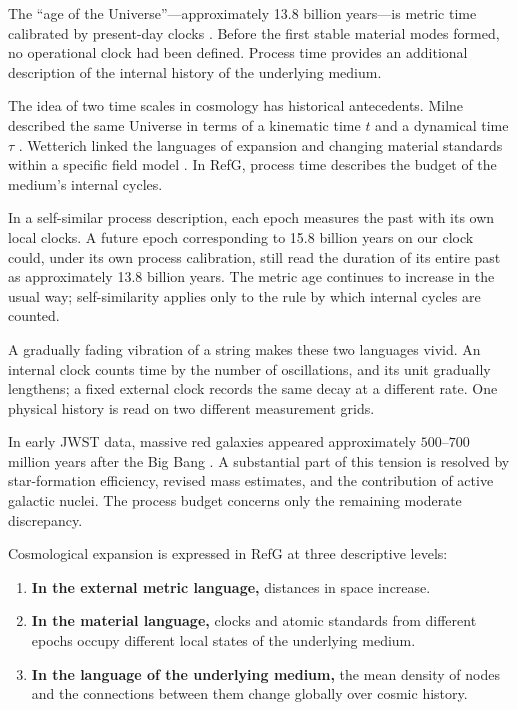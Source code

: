 \documentclass[11pt,a4paper]{article}
\begin{document}
The ``age of the Universe''---approximately 13.8 billion years---is metric time calibrated by present-day clocks \citep{planck2020}. Before the first stable material modes formed, no operational clock had been defined. Process time provides an additional description of the internal history of the underlying medium.

The idea of two time scales in cosmology has historical antecedents. Milne described the same Universe in terms of a kinematic time $t$ and a dynamical time $\tau$ \citep{milne1935,milne1948}. Wetterich linked the languages of expansion and changing material standards within a specific field model \citep{wetterich2013}. In RefG, process time describes the budget of the medium's internal cycles.

In a self-similar process description, each epoch measures the past with its own local clocks. A future epoch corresponding to 15.8 billion years on our clock could, under its own process calibration, still read the duration of its entire past as approximately 13.8 billion years. The metric age continues to increase in the usual way; self-similarity applies only to the rule by which internal cycles are counted.

A gradually fading vibration of a string makes these two languages vivid. An internal clock counts time by the number of oscillations, and its unit gradually lengthens; a fixed external clock records the same decay at a different rate. One physical history is read on two different measurement grids.

In early JWST data, massive red galaxies appeared approximately $500$--$700$ million years after the Big Bang \citep{labbe2023}. A substantial part of this tension is resolved by star-formation efficiency, revised mass estimates, and the contribution of active galactic nuclei. The process budget concerns only the remaining moderate discrepancy.

Cosmological expansion is expressed in RefG at three descriptive levels:

\begin{enumerate}
\item \textbf{In the external metric language,} distances in space increase.
\item \textbf{In the material language,} clocks and atomic standards from different epochs occupy different local states of the underlying medium.
\item \textbf{In the language of the underlying medium,} the mean density of nodes and the connections between them change globally over cosmic history.
\end{enumerate}
\end{document}
